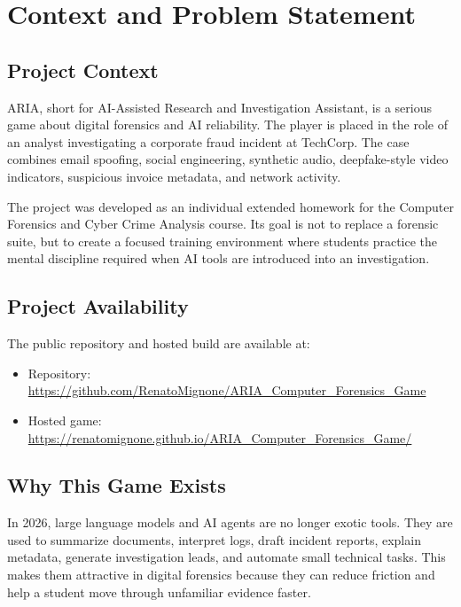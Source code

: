 \chapter{Context and Problem Statement}

\section{Project Context}

ARIA, short for AI-Assisted Research and Investigation Assistant, is a serious game about digital forensics and AI reliability. The player is placed in the role of an analyst investigating a corporate fraud incident at TechCorp. The case combines email spoofing, social engineering, synthetic audio, deepfake-style video indicators, suspicious invoice metadata, and network activity.

The project was developed as an individual extended homework for the Computer Forensics and Cyber Crime Analysis course. Its goal is not to replace a forensic suite, but to create a focused training environment where students practice the mental discipline required when AI tools are introduced into an investigation.

\section{Project Availability}

The public repository and hosted build are available at:

\begin{itemize}[leftmargin=*]
  \item Repository: \url{https://github.com/RenatoMignone/ARIA_Computer_Forensics_Game}
  \item Hosted game: \url{https://renatomignone.github.io/ARIA_Computer_Forensics_Game/}
\end{itemize}

\section{Why This Game Exists}

In 2026, large language models and AI agents are no longer exotic tools. They are used to summarize documents, interpret logs, draft incident reports, explain metadata, generate investigation leads, and automate small technical tasks. This makes them attractive in digital forensics because they can reduce friction and help a student move through unfamiliar evidence faster.

